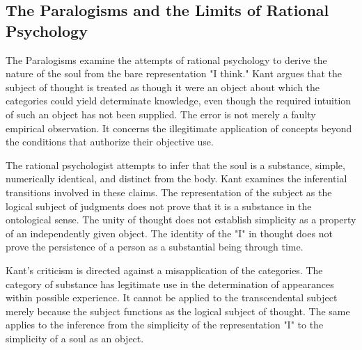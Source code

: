 
\subsection{The Paralogisms and the Limits of Rational Psychology}
\label{subsec:ch08-kant-paralogisms}

\label{para:VS.B01.P01.C08.S10.SS08.P001}

The Paralogisms examine the attempts of rational
psychology to derive the nature of the soul from
the bare representation "I think." Kant argues
that the subject of thought is treated as though
it were an object about which the categories
could yield determinate knowledge, even though
the required intuition of such an object has
not been supplied. The error is not merely
a faulty empirical observation. It concerns
the illegitimate application of concepts beyond
the conditions that authorize their objective use.
\cite[A341/B399--A405/B432]{KantCritiquePureReason}

\label{para:VS.B01.P01.C08.S10.SS08.P002}

The rational psychologist attempts to infer
that the soul is a substance, simple, numerically
identical, and distinct from the body. Kant
examines the inferential transitions involved
in these claims. The representation of the
subject as the logical subject of judgments
does not prove that it is a substance in the
ontological sense. The unity of thought does
not establish simplicity as a property of
an independently given object. The identity
of the "I" in thought does not prove the
persistence of a person as a substantial
being through time.

\label{para:VS.B01.P01.C08.S10.SS08.P003}

Kant's criticism is directed against a
misapplication of the categories. The category
of substance has legitimate use in the
determination of appearances within possible
experience. It cannot be applied to the
transcendental subject merely because the
subject functions as the logical subject
of thought. The same applies to the inference
from the simplicity of the representation
"I" to the simplicity of a soul as an object.


